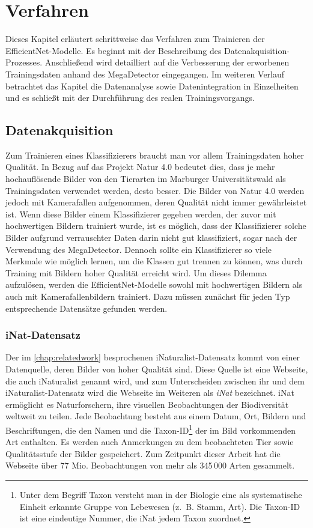 \chapter{Verfahren} \label{chap:training}

Dieses Kapitel erläutert schrittweise das Verfahren zum Trainieren der EfficientNet-Modelle. Es beginnt mit der Beschreibung des Datenakquisition-Prozesses. Anschließend wird detailliert auf die Verbesserung der erworbenen Trainingsdaten anhand des MegaDetector eingegangen. Im weiteren Verlauf betrachtet das Kapitel die Datenanalyse sowie Datenintegration in Einzelheiten und es schließt mit der Durchführung des realen Trainingsvorgangs.

\section{Datenakquisition}

Zum Trainieren eines Klassifizierers braucht man vor allem Trainingsdaten hoher Qualität. In Bezug auf das Projekt Natur 4.0 bedeutet dies, dass je mehr hochauflösende Bilder von den Tierarten im Marburger Universitätswald als Trainingsdaten verwendet werden, desto besser. Die Bilder von Natur 4.0 werden jedoch mit Kamerafallen aufgenommen, deren Qualität nicht immer gewährleistet ist. Wenn diese Bilder einem Klassifizierer gegeben werden, der zuvor mit hochwertigen Bildern trainiert wurde, ist es möglich, dass der Klassifizierer solche Bilder aufgrund verrauschter Daten darin nicht gut klassifiziert, sogar nach der Verwendung des MegaDetector. Dennoch sollte ein Klassifizierer so viele Merkmale wie möglich lernen, um die Klassen gut trennen zu können, was durch Training mit Bildern hoher Qualität erreicht wird. Um dieses Dilemma aufzulösen, werden die EfficientNet-Modelle sowohl mit hochwertigen Bildern als auch mit Kamerafallenbildern trainiert. Dazu müssen zunächst für jeden Typ entsprechende Datensätze gefunden werden.

\subsection{iNat-Datensatz}

Der im \autoref{chap:relatedwork} besprochenen iNaturalist-Datensatz kommt von einer Datenquelle, deren Bilder von hoher Qualität sind. Diese Quelle ist eine Webseite, die auch iNaturalist genannt wird, und zum Unterscheiden zwischen ihr und dem iNaturalist-Datensatz wird die Webseite im Weiteren als \emph{iNat} bezeichnet. iNat ermöglicht es Naturforschern, ihre visuellen Beobachtungen der Biodiversität weltweit zu teilen. Jede Beobachtung besteht aus einem Datum, Ort, Bildern und Beschriftungen, die den Namen und die Taxon-ID\footnote{Unter dem Begriff Taxon versteht man in der Biologie eine als systematische Einheit erkannte Gruppe von Lebewesen (z.~B. Stamm, Art). Die Taxon-ID ist eine eindeutige Nummer, die iNat jedem Taxon zuordnet.} der im Bild vorkommenden Art enthalten. Es werden auch Anmerkungen zu dem beobachteten Tier sowie Qualitätsstufe der Bilder gespeichert. Zum Zeitpunkt dieser Arbeit hat die Webseite über 77 Mio. Beobachtungen von mehr als 345\,000 Arten gesammelt.

